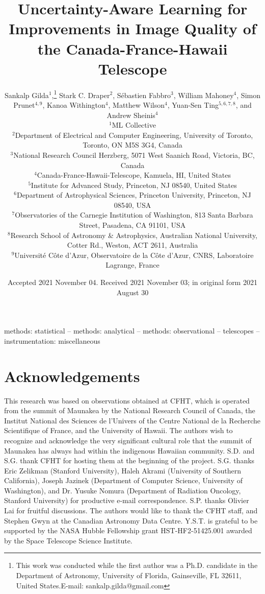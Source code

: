 \documentclass[fleqn,usenatbib]{mnras}
\title[Deep Learning for Improved Seeing]{Uncertainty-Aware Learning for Improvements in Image Quality of the Canada-France-Hawaii Telescope}
\author[S. Gilda]{Sankalp Gilda$^{1}$,\thanks{This work was conducted while the first author was a Ph.D. candidate in the Department of Astronomy, University of Florida, Gainseville, FL 32611, United States.\newline E-mail: sankalp.gilda@gmail.com}
Stark C. Draper$^{2}$,
S\'ebastien Fabbro$^{3}$,
William Mahoney$^{4}$,
\newauthor
Simon Prunet$^{4,9}$,
Kanoa Withington$^{4}$,
Matthew Wilson$^{4}$,
Yuan-Sen Ting$^{5,6,7,8}$,
\newauthor
and Andrew Sheinis$^{4}$
\\
$^{1}$ML Collective\\
$^{2}$Department of Electrical and Computer Engineering, University of Toronto, Toronto, ON M5S 3G4, Canada\\
$^{3}$National Research Council Herzberg, 5071 West Saanich Road, Victoria, BC, Canada\\
$^{4}$Canada-France-Hawaii-Telescope, Kamuela, HI, United States\\
$^{5}$Institute for Advanced Study, Princeton, NJ 08540, United States\\
$^{6}$Department of Astrophysical Sciences, Princeton University, Princeton, NJ 08540, USA\\
$^{7}$Observatories of the Carnegie Institution of Washington, 813 Santa Barbara Street, Pasadena, CA 91101, USA\\
$^{8}$Research School of Astronomy \& Astrophysics, Australian National University, Cotter Rd., Weston, ACT 2611, Australia \\
$^{9}$Université Côte d'Azur, Observatoire de la Côte d'Azur, CNRS, Laboratoire Lagrange, France \\
}
\date{Accepted 2021 November 04. Received 2021 November 03; in original form 2021 August 30}
\begin{document}
\label{firstpage}
\pagerange{\pageref{firstpage}--\pageref{lastpage}}
\maketitle

\begin{abstract}

\end{abstract}
\begin{keywords}
methods: statistical -- methods: analytical -- methods: observational -- telescopes -- instrumentation: miscellaneous
\end{keywords}














\section*{Acknowledgements}
This research was based on observations obtained at CFHT, which is operated from the summit of Maunakea by the National Research Council of Canada, the Institut National des Sciences de l’Univers of the Centre National de la Recherche Scientifique of France, and the University of Hawaii. The authors wish to recognize and acknowledge the very significant cultural role that the summit of Maunakea has always had within the indigenous Hawaiian community. S.D. and S.G. thank CFHT for hosting them at the beginning of the project. S.G. thanks Eric Zelikman (Stanford University), Haleh Akrami (University of Southern California), Joseph Jazinek (Department of Computer Science, University of Washington), and Dr. Yusuke Nomura (Department of Radiation Oncology, Stanford University) for productive e-mail correspondence. S.P. thanks Olivier Lai for fruitful discussions. The authors would like to thank the CFHT staff, and Stephen Gwyn at the Canadian Astronomy Data Centre. Y.S.T. is grateful to be supported by the NASA Hubble Fellowship grant HST-HF2-51425.001 awarded by the Space Telescope Science Institute.
%
\end{document}
